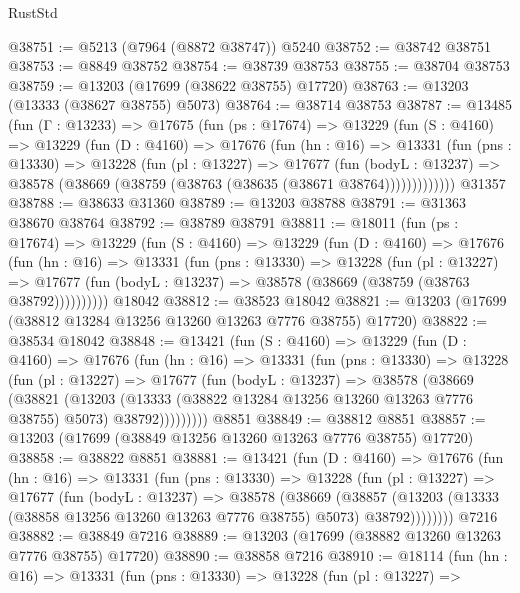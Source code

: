 \begin{lexlean}{RustStd}
\begin{coremodule}
@38751 := @5213 (@7964 (@8872 @38747)) @5240
@38752 := @38742 @38751
@38753 := @8849 @38752
@38754 := @38739 @38753
@38755 := @38704 @38753
@38759 := @13203 (@17699 (@38622 @38755) @17720)
@38763 := @13203 (@13333 (@38627 @38755) @5073)
@38764 := @38714 @38753
@38787 := @13485
    (fun (Γ : @13233) =>
    @17675
      (fun (ps : @17674) =>
      @13229
        (fun (S : @4160) =>
        @13229
          (fun (D : @4160) =>
          @17676
            (fun (hn : @16) =>
            @13331
              (fun (pns : @13330) =>
              @13228
                (fun (pl : @13227) =>
                @17677
                  (fun (bodyL : @13237) =>
                  @38578 (@38669 (@38759 (@38763 (@38635 (@38671 @38764)))))))))))))
    @31357
@38788 := @38633 @31360
@38789 := @13203 @38788
@38791 := @31363 @38670 @38764
@38792 := @38789 @38791
@38811 := @18011
    (fun (ps : @17674) =>
    @13229
      (fun (S : @4160) =>
      @13229
        (fun (D : @4160) =>
        @17676
          (fun (hn : @16) =>
          @13331
            (fun (pns : @13330) =>
            @13228
              (fun (pl : @13227) =>
              @17677 (fun (bodyL : @13237) => @38578 (@38669 (@38759 (@38763 @38792))))))))))
    @18042
@38812 := @38523 @18042
@38821 := @13203 (@17699 (@38812 @13284 @13256 @13260 @13263 @7776 @38755) @17720)
@38822 := @38534 @18042
@38848 := @13421
    (fun (S : @4160) =>
    @13229
      (fun (D : @4160) =>
      @17676
        (fun (hn : @16) =>
        @13331
          (fun (pns : @13330) =>
          @13228
            (fun (pl : @13227) =>
            @17677
              (fun (bodyL : @13237) =>
              @38578
                (@38669
                  (@38821
                    (@13203
                      (@13333 (@38822 @13284 @13256 @13260 @13263 @7776 @38755) @5073)
                      @38792)))))))))
    @8851
@38849 := @38812 @8851
@38857 := @13203 (@17699 (@38849 @13256 @13260 @13263 @7776 @38755) @17720)
@38858 := @38822 @8851
@38881 := @13421
    (fun (D : @4160) =>
    @17676
      (fun (hn : @16) =>
      @13331
        (fun (pns : @13330) =>
        @13228
          (fun (pl : @13227) =>
          @17677
            (fun (bodyL : @13237) =>
            @38578
              (@38669
                (@38857
                  (@13203 (@13333 (@38858 @13256 @13260 @13263 @7776 @38755) @5073) @38792))))))))
    @7216
@38882 := @38849 @7216
@38889 := @13203 (@17699 (@38882 @13260 @13263 @7776 @38755) @17720)
@38890 := @38858 @7216
@38910 := @18114
    (fun (hn : @16) =>
    @13331
      (fun (pns : @13330) =>
      @13228
        (fun (pl : @13227) =>

\end{coremodule}
\end{lexlean}
